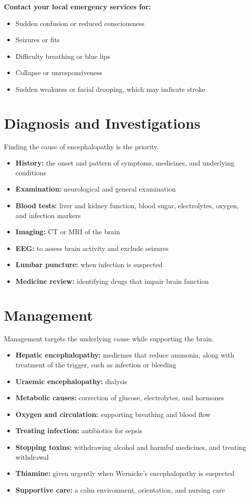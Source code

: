 \textbf{Contact your local emergency services for:}
\begin{itemize}
    \item Sudden confusion or reduced consciousness
    \item Seizures or fits
    \item Difficulty breathing or blue lips
    \item Collapse or unresponsiveness
    \item Sudden weakness or facial drooping, which may indicate stroke
\end{itemize}

\section*{Diagnosis and Investigations}
Finding the cause of encephalopathy is the priority.
\begin{itemize}
    \item \textbf{History:} the onset and pattern of symptoms, medicines, and underlying conditions
    \item \textbf{Examination:} neurological and general examination
    \item \textbf{Blood tests:} liver and kidney function, blood sugar, electrolytes, oxygen, and infection markers
    \item \textbf{Imaging:} CT or MRI of the brain
    \item \textbf{EEG:} to assess brain activity and exclude seizures
    \item \textbf{Lumbar puncture:} when infection is suspected
    \item \textbf{Medicine review:} identifying drugs that impair brain function
\end{itemize}

\section*{Management}
Management targets the underlying cause while supporting the brain.
\begin{itemize}
    \item \textbf{Hepatic encephalopathy:} medicines that reduce ammonia, along with treatment of the trigger, such as infection or bleeding
    \item \textbf{Uraemic encephalopathy:} dialysis
    \item \textbf{Metabolic causes:} correction of glucose, electrolytes, and hormones
    \item \textbf{Oxygen and circulation:} supporting breathing and blood flow
    \item \textbf{Treating infection:} antibiotics for sepsis
    \item \textbf{Stopping toxins:} withdrawing alcohol and harmful medicines, and treating withdrawal
    \item \textbf{Thiamine:} given urgently when Wernicke's encephalopathy is suspected
    \item \textbf{Supportive care:} a calm environment, orientation, and nursing care
\end{itemize}

